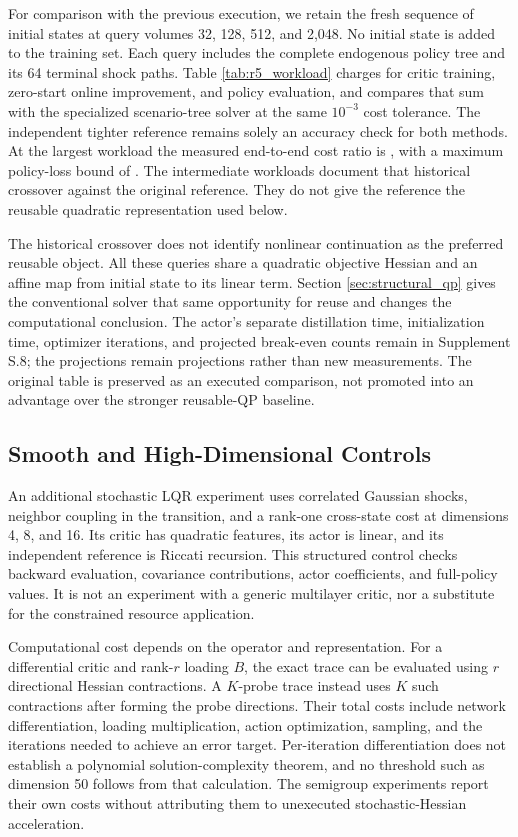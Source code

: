 For comparison with the previous execution, we retain the fresh sequence of initial states at query volumes 32, 128, 512, and 2,048. No initial state is added to the training set. Each query includes the complete endogenous policy tree and its 64 terminal shock paths. Table \ref{tab:r5_workload} charges for critic training, zero-start online improvement, and policy evaluation, and compares that sum with the specialized scenario-tree solver at the same $10^{-3}$ cost tolerance. The independent tighter reference remains solely an accuracy check for both methods. At the largest workload the measured end-to-end cost ratio is \NBOResourceBigRatio{}, with a maximum policy-loss bound of \NBOResourceBigLoss{}. The intermediate workloads document that historical crossover against the original reference. They do not give the reference the reusable quadratic representation used below.


The historical crossover does not identify nonlinear continuation as the preferred reusable object. All these queries share a quadratic objective Hessian and an affine map from initial state to its linear term. Section \ref{sec:structural_qp} gives the conventional solver that same opportunity for reuse and changes the computational conclusion. The actor's separate distillation time, initialization time, optimizer iterations, and projected break-even counts remain in Supplement S.8; the projections remain projections rather than new measurements. The original table is preserved as an executed comparison, not promoted into an advantage over the stronger reusable-QP baseline.

\subsection{Smooth and High-Dimensional Controls}
An additional stochastic LQR experiment uses correlated Gaussian shocks, neighbor coupling in the transition, and a rank-one cross-state cost at dimensions 4, 8, and 16. Its critic has quadratic features, its actor is linear, and its independent reference is Riccati recursion. This structured control checks backward evaluation, covariance contributions, actor coefficients, and full-policy values. It is not an experiment with a generic multilayer critic, nor a substitute for the constrained resource application.

Computational cost depends on the operator and representation. For a differential critic and rank-$r$ loading $B$, the exact trace can be evaluated using $r$ directional Hessian contractions. A $K$-probe trace instead uses $K$ such contractions after forming the probe directions. Their total costs include network differentiation, loading multiplication, action optimization, sampling, and the iterations needed to achieve an error target. Per-iteration differentiation does not establish a polynomial solution-complexity theorem, and no threshold such as dimension 50 follows from that calculation. The semigroup experiments report their own costs without attributing them to unexecuted stochastic-Hessian acceleration.
